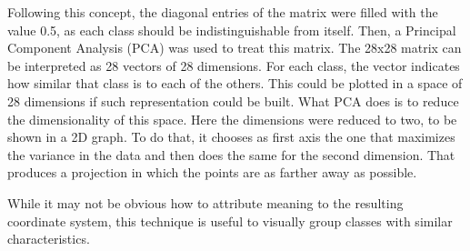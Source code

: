 Following this concept, the diagonal entries of the matrix were filled with the value 0.5, as each class should be indistinguishable from itself. Then, a Principal Component Analysis (PCA) \cite{amirani_new_2008} was used to treat this matrix. The 28x28 matrix can be interpreted as 28 vectors of 28 dimensions. For each class, the vector indicates how similar that class is to each of the others. This could be plotted in a space of 28 dimensions if such representation could be built. What PCA does is to reduce the dimensionality of this space. Here the dimensions were reduced to two, to be shown in a 2D graph. To do that, it chooses as first axis the one that maximizes the variance in the data and then does the same for the second dimension. That produces a projection in which the points are as farther away as possible.

While it may not be obvious how to attribute meaning to the resulting coordinate system, this technique is useful to visually group classes with similar characteristics.

